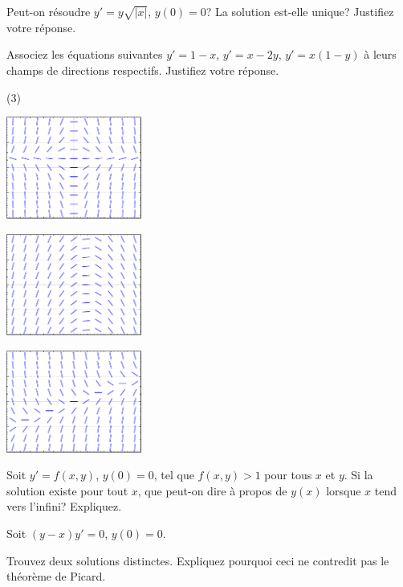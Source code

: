 \begin{exercise}
Peut-on résoudre  $y' = y\sqrt{\lvert x\rvert}$, $y(0) = 0$?  
La solution est-elle unique?
Justifiez votre réponse.
\end{exercise}

\begin{samepage}
\begin{exercise}
Associez les équations suivantes $y'=1-x$, $y'=x-2y$, $y' = x(1-y)$ à leurs champs de directions respectifs.
Justifiez votre réponse.
\begin{tasks}(3)
\task
\parbox[c]{1.75in}{\includegraphics[width=1.75in]{figures/yprimex1minusyslope}}
\task
\parbox[c]{1.75in}{\includegraphics[width=1.75in]{figures/yprime1minusxslope}}
\task
\parbox[c]{1.75in}{\includegraphics[width=1.75in]{figures/yprimexminus2yslope}}
\end{tasks}
\end{exercise}
\end{samepage}

\begin{exercise}[défi]
Soit $y' = f(x,y)$, $y(0) = 0$, tel que $f(x,y) > 1$
pour tous $x$ et $y$.   Si la solution existe  pour tout $x$,  que peut-on dire à propos de $y(x)$ lorsque $x$ tend vers l'infini?  Expliquez.
\end{exercise}

\begin{exercise}[défi]
Soit $(y-x)y' = 0$, $y(0) = 0$.
\begin{tasks}
\task Trouvez deux solutions distinctes.
\task Expliquez pourquoi ceci ne contredit pas le théorème de Picard.  
\end{tasks}
\end{exercise}

